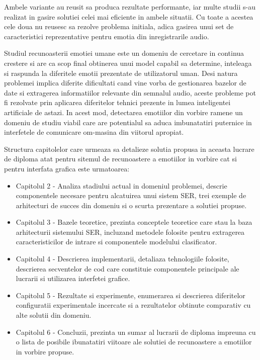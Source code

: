 \documentclass[a4paper,12pt]{book}
\begin{document}
					Ambele variante au reusit sa produca rezultate performante, iar multe studii s-au realizat in gasire solutiei celei mai eficiente in ambele situatii. Cu toate a acestea cele doua nu reusesc sa rezolve problema initiala, adica gasirea unui set de caracteristici reprezentative pentru emotia din inregistrarile audio. \par
					\hfill \par
					Studiul recunoasterii emotiei umane este un domeniu de cercetare in continua crestere si are ca scop final obtinerea unui model capabil sa determine, inteleaga si raspunda la diferitele emotii prezentate de utilizatorul uman. Desi natura problemei implica diferite dificultati cand vine vorba de gestionarea bazelor de date si extragerea informatiilor relevante din semnalul audio, aceste probleme pot fi rezolvate prin aplicarea diferitelor tehnici prezente in lumea inteligentei artificiale de astazi. In acest mod, detectarea emotiilor din vorbire ramene un domeniu de studiu viabil care are potentialul sa aduca imbunatatiri puternice in interfetele de comunicare om-masina din viitorul apropiat. \par
					Structura capitolelor care urmeaza sa detalieze solutia propusa in aceasta lucrare de diploma atat pentru sitemul de recunoastere a emotiilor in vorbire cat si pentru interfata grafica este urmatoarea:
					\begin{itemize}
						\item Capitolul 2 - Analiza stadiului actual in domeniul problemei, descrie componentele necesare pentru alcatuirea unui sistem SER, trei exemple de arhitecturi de succes din domeniu si o scurta prezentare a solutiei propuse.
						\item Capitolul 3 - Bazele teoretice, prezinta conceptele teoretice care stau la baza arhitecturii sistemului SER, incluzand metodele folosite pentru extragerea caracteristicilor de intrare si componentele modelului clasificator. 
						\item Capitolul 4 - Descrierea implementarii, detaliaza tehnologiile folosite, descrierea secventelor de cod care constituie componentele principale ale lucrarii si utilizarea interfetei grafice.
						\item Capitolul 5 - Rezultate si experimente, enumerarea si descrierea diferitelor configuratii experimentale incercate si a rezultatelor obtinute comparativ cu alte solutii din domeniu.
						\item Capitolul 6 - Concluzii, prezinta un sumar al lucrarii de diploma impreuna cu o lista de posibile ibunatatiri viitoare ale solutiei de recunoastere a emotiilor in vorbire propuse.
					\end{itemize} 
					
\end{document}
